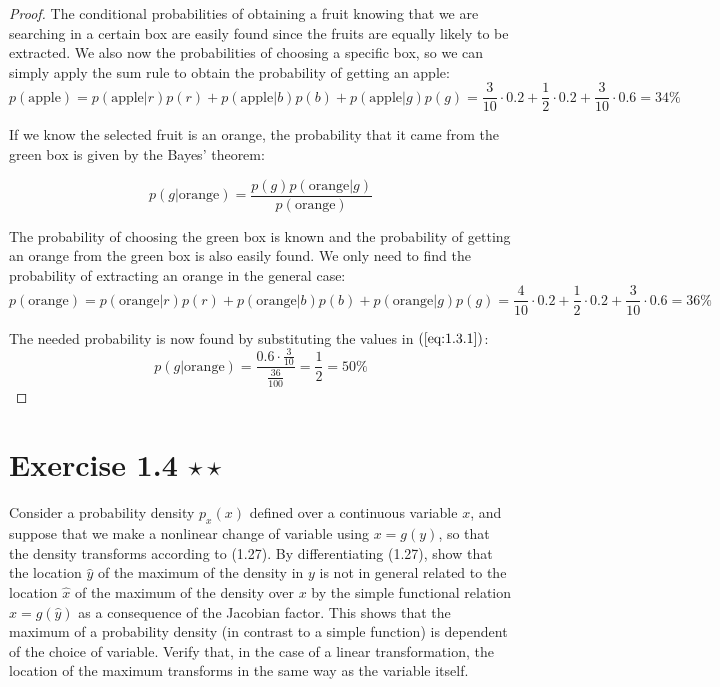 \vspace{1em}

\begin{proof}
    The conditional probabilities of obtaining a fruit knowing that we are 
    searching in a certain box are easily found since the fruits are equally
    likely to be extracted. We also now the probabilities of choosing a specific box,
    so we can simply apply the sum rule to obtain the probability of getting an apple:
    \[
        p(\text{apple}) 
        = p(\text{apple} | r)p(r) + p(\text{apple} | b)p(b) + p(\text{apple} | g)p(g) 
        = \frac{3}{10} \cdot 0.2 + \frac{1}{2} \cdot 0.2 + \frac{3}{10} \cdot 0.6
        = 34\%
    \] 

    If we know the selected fruit is an orange, the probability that it came from
    the green box is given by the Bayes' theorem:

    \begin{equation*}\label{eq:1.3.1}\tag{1.3.1}
        p(g | \text{orange}) = \frac{p(g)p(\text{orange} | g)}{p(\text{orange})}
    \end{equation*}

    The probability of choosing the green box is known and the probability of getting
    an orange from the green box is also easily found. We only need to find the probability
    of extracting an orange in the general case:
    \[
        p(\text{orange}) 
        = p(\text{orange} | r)p(r) + p(\text{orange} | b)p(b) + p(\text{orange} | g)p(g) 
        = \frac{4}{10} \cdot 0.2 + \frac{1}{2} \cdot 0.2 + \frac{3}{10} \cdot 0.6
        = 36\%
    \]

    The needed probability is now found by substituting the values in $(\ref{eq:1.3.1})$:
    \[
        p(g | \text{orange}) = \frac{0.6 \cdot \frac{3}{10}}{\frac{36}{100}} = \frac{1}{2} = 50\%
    \] 
\end{proof}

\section*{Exercise 1.4 $\star \star$}
Consider a probability density $p_x(x)$ defined over a continuous variable
$x$, and suppose that we make a nonlinear change of variable using $x = g(y)$,
so that the density transforms according to (1.27). By differentiating (1.27),
show that the location  $\widehat{y}$ of the maximum of the density in
$y$ is not in general related to the location $\widehat{x}$ of the maximum of the
density over $x$ by the simple functional relation $\widehat{x} = g(\widehat{y})$ 
as a consequence of the Jacobian factor. This shows that the maximum of a probability
density (in contrast to a simple function) is dependent of the choice of variable.
Verify that, in the case of a linear transformation, the location of the maximum
transforms in the same way as the variable itself.

